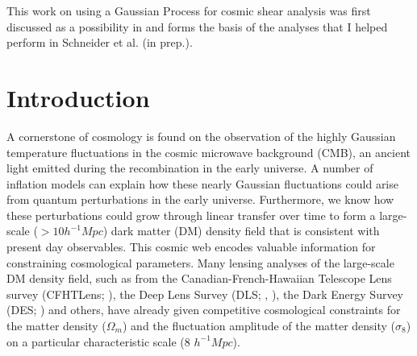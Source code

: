  
This work on using a Gaussian Process for cosmic shear analysis 
was first discussed as a possibility in  \citep{Schneider2014}  and 
forms the basis of the analyses that I helped perform 
in Schneider et al. (in prep.). 

\section{Introduction} 

A cornerstone of cosmology is found on the 
observation of the highly Gaussian temperature fluctuations in the cosmic microwave 
background (CMB), an ancient light emitted during the recombination in the early
universe. A number of inflation models can explain how these
nearly Gaussian fluctuations could arise from quantum perturbations in the 
early universe. Furthermore, we know how these perturbations could grow
through linear transfer over time to form a large-scale ($> 10 h^{-1} Mpc$) 
dark matter (DM) density field that is consistent with present
day observables. 
This cosmic web encodes valuable information for constraining cosmological
parameters. Many lensing analyses of the large-scale DM density field, such as from
the Canadian-French-Hawaiian Telescope Lens survey (CFHTLens;
\citealt{Kilbinger2013}), the Deep Lens Survey
(DLS; \citealt{Jee2013a}, \citealt{Wittman2002}), the Dark Energy Survey 
(DES; \citealt{Abbott2016}) and others, 
have already given competitive cosmological constraints for 
 the matter density ($\Omega_m$) and the fluctuation amplitude 
of the matter density ($\sigma_8$) on a particular characteristic scale (8
$h^{-1} Mpc$). 


